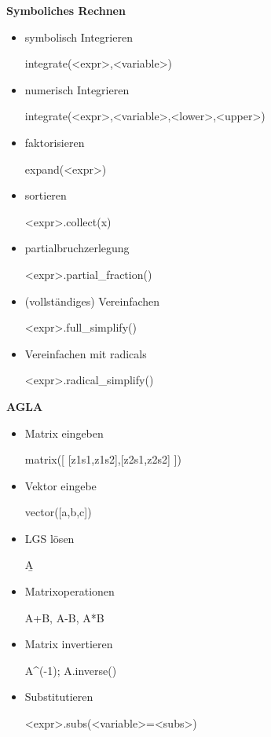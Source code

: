 \documentclass[a4paper,9pt,DIV15,twocolumn]{scrartcl}
\begin{document}
\textbf{Symboliches Rechnen}
\begin{itemize}
\item symbolisch Integrieren
\begin{sagein}
integrate(<expr>,<variable>)
\end{sagein}
 \item numerisch Integrieren 
\begin{sagein}
integrate(<expr>,<variable>,<lower>,<upper>)
\end{sagein}
\item faktorisieren 
\begin{sagein}
expand(<expr>)
\end{sagein}
\item sortieren 
\begin{sagein}
<expr>.collect(x)
\end{sagein}
\item partialbruchzerlegung 
\begin{sagein}
<expr>.partial_fraction()
\end{sagein}
\item (vollständiges) Vereinfachen 
\begin{sagein}
<expr>.full_simplify()
\end{sagein}
\item Vereinfachen mit radicals 
\begin{sagein}
<expr>.radical_simplify()
\end{sagein}
\end{itemize}

\textbf{AGLA}
\begin{itemize}
\item Matrix eingeben 
\begin{sagein}
matrix([ [z1s1,z1s2],[z2s1,z2s2] ])
\end{sagein}
 \item Vektor eingebe 
\begin{sagein}
vector([a,b,c])
\end{sagein}
\item LGS lösen 
\begin{sagein}
A\b
\end{sagein}
\item Matrixoperationen 
\begin{sagein}
A+B, A-B, A*B
\end{sagein}
\item Matrix invertieren 
\begin{sagein}
A^(-1); A.inverse()
\end{sagein}
\item Substitutieren 
\begin{sagein}
<expr>.subs(<variable>=<subs>)
\end{sagein}
\end{itemize}
\end{document}
